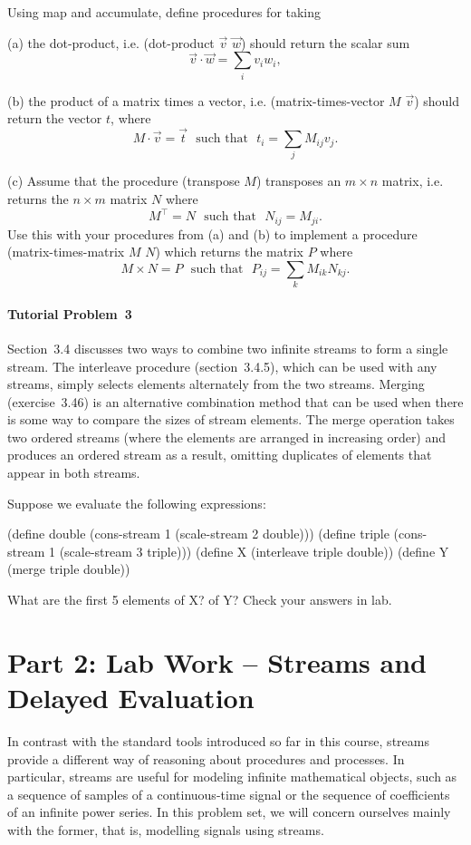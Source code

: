 Using {\cf map} and {\cf accumulate}, define procedures for taking

(a) the dot-product, i.e. {\cf (dot-product $\vec{v}$ $\vec{w}$)} should return
the scalar sum \[\vec{v} \cdot \vec{w} = \sum_i v_iw_i,\]

(b) the product of a matrix times a vector, i.e. {\cf (matrix-times-vector
$M$ $\vec{v}$)} should return the vector $t$, where
\[M \cdot \vec{v} = \vec{t} ~~~\mbox{such that}~~~ t_i = \sum_j M_{ij}v_j.\]

(c) Assume that the procedure {\cf (transpose $M$)} transposes an $m \times n$
matrix, i.e. returns the $n \times m$ matrix $N$ where
\[M^{\top} = N ~~~\mbox{such that}~~~ N_{ij} = M_{ji}.\]
Use this with your procedures from (a) and (b) to implement a procedure {\cf
(matrix-times-matrix $M$ $N$)} which returns the matrix $P$ where
\[M \times N = P ~~~\mbox{such that}~~~ P_{ij} = \sum_k M_{ik}N_{kj}.\]

\paragraph{Tutorial Problem~3} 
Section~3.4 discusses two ways to combine two
infinite streams to form a single stream. The {\cf interleave} procedure
(section~3.4.5), which can be used with any streams, simply selects
elements alternately from the two streams. Merging (exercise~3.46) is
an alternative combination method that can be used when there is some
way to compare the sizes of stream elements. The {\cf merge} operation
takes two ordered streams (where the elements are arranged in
increasing order) and produces an ordered stream as a result,
omitting duplicates of elements that appear in both streams.

{\samepage
Suppose we evaluate the following expressions:

\nopagebreak[4]
\beginlisp 
(define double (cons-stream 1 (scale-stream 2 double)))
(define triple (cons-stream 1 (scale-stream 3 triple)))
\null
(define X (interleave triple double))
(define Y (merge      triple double))
\endlisp
}

What are the first 5 elements of X? of Y? Check your answers in lab.

\section{Part 2: Lab Work -- Streams and Delayed Evaluation}

In contrast with the standard tools introduced so far in this course, streams
provide a different way of reasoning about procedures and processes.  In
particular, streams are useful for modeling infinite mathematical objects, such
as a sequence of samples of a continuous-time signal or the sequence of
coefficients of an infinite power series.  In this problem set, we will
concern ourselves mainly with the former, that is, modelling signals using
streams.


